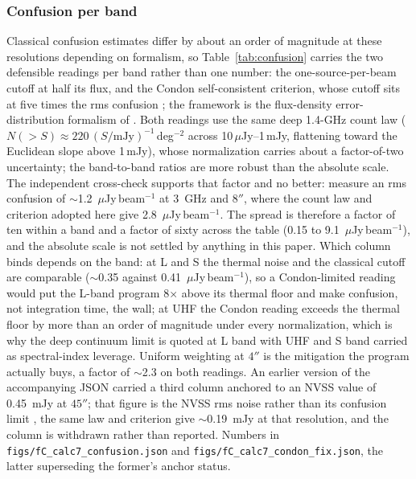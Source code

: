 \documentclass[11pt]{article}
\begin{document}
\subsubsection{Confusion per band}
\label{app:confusion}
Classical confusion estimates differ by about an order of magnitude at these
resolutions depending on formalism, so Table~\ref{tab:confusion} carries the
two defensible readings per band rather than one number: the
one-source-per-beam cutoff at half its flux, and the Condon self-consistent
criterion, whose cutoff sits at five times the rms confusion
\citep{Condon2007}; the framework is the flux-density error-distribution
formalism of \citet{Condon1974}. Both readings use the same deep 1.4-GHz
count law
($N(>S) \approx 220\,(S/\mathrm{mJy})^{-1}$\,deg$^{-2}$ across
10\,$\mu$Jy--1\,mJy, flattening toward the Euclidean slope above 1\,mJy),
whose normalization carries about a factor-of-two uncertainty; the band-to-band
ratios are more robust than the absolute scale. The independent cross-check
supports that factor and no better: \citet{Vernstrom2014} measure an rms
confusion of $\sim$1.2~$\mu$Jy\,beam$^{-1}$ at 3~GHz and $8''$, where the
count law and criterion adopted here give 2.8~$\mu$Jy\,beam$^{-1}$. The
spread is therefore a factor of ten within a band and a factor of sixty
across the table (0.15 to 9.1~$\mu$Jy\,beam$^{-1}$), and the absolute scale
is not settled by anything in this paper. Which column binds depends on the
band: at L and S the thermal noise and the classical cutoff are comparable
($\sim$0.35 against 0.41~$\mu$Jy\,beam$^{-1}$), so a Condon-limited reading
would put the L-band program 8$\times$ above its thermal floor and make
confusion, not integration time, the wall; at UHF the Condon reading exceeds
the thermal floor by more than an order of magnitude under every
normalization, which is why the deep continuum limit is quoted at L band with
UHF and S band carried as spectral-index leverage. Uniform weighting at
$4''$ is the mitigation the program actually buys, a factor of $\sim$2.3 on both readings. An
earlier version of the accompanying JSON carried a third column anchored to
an NVSS value of 0.45~mJy at $45''$; that figure is the NVSS rms noise rather
than its confusion limit \citep{Condon1998}, the same law and criterion give
$\sim$0.19~mJy at that resolution, and the column is withdrawn rather than
reported. Numbers in
\texttt{figs/fC\_calc7\_confusion.json} and
\texttt{figs/fC\_calc7\_condon\_fix.json}, the latter superseding the
former's anchor status.
\end{document}
